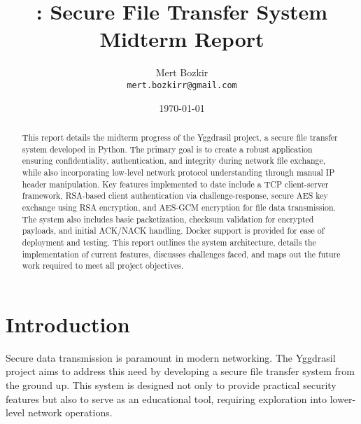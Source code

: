 \documentclass[11pt]{article}
\title{\fbox{\href{https://github.com/mertbozkir/yggdrasil}{Yggdrasil}}: Secure File Transfer System \\ Midterm Report}
\author{
  Mert Bozkir \\
  \texttt{mert.bozkirr@gmail.com} \\
}
\date{\today}
\begin{document}
\maketitle

\vspace{30mm}
\begin{abstract}
This report details the midterm progress of the Yggdrasil project, a secure file transfer system developed in Python. The primary goal is to create a robust application ensuring confidentiality, authentication, and integrity during network file exchange, while also incorporating low-level network protocol understanding through manual IP header manipulation. Key features implemented to date include a TCP client-server framework, RSA-based client authentication via challenge-response, secure AES key exchange using RSA encryption, and AES-GCM encryption for file data transmission. The system also includes basic packetization, checksum validation for encrypted payloads, and initial ACK/NACK handling. Docker support is provided for ease of deployment and testing. This report outlines the system architecture, details the implementation of current features, discusses challenges faced, and maps out the future work required to meet all project objectives.
\end{abstract}

\vspace{60mm}

\section{Introduction}
\label{sec:introduction}
Secure data transmission is paramount in modern networking. The Yggdrasil project aims to address this need by developing a secure file transfer system from the ground up. This system is designed not only to provide practical security features but also to serve as an educational tool, requiring exploration into lower-level network operations.
\end{document}
